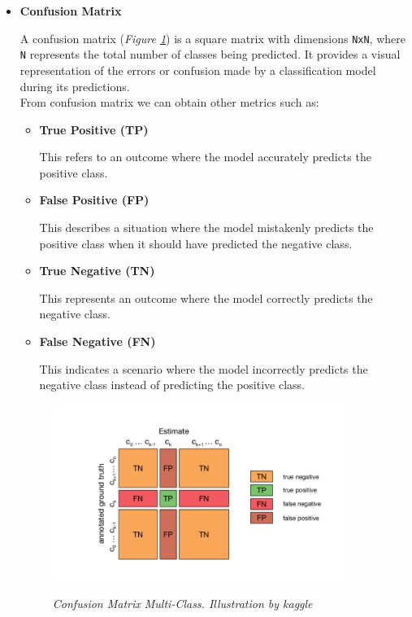 \begin{itemize}
  \item \textbf{Confusion Matrix}

A confusion matrix (\textit{Figure \ref{fig:confusion-matrix}}) is a square matrix with dimensions {\tt NxN},
where {\tt N} represents the total number of classes being predicted.
It provides a visual representation of the errors or confusion made by a classification
model during its predictions. \\

From confusion matrix we can obtain other metrics such as:

\begin{itemize}
\item \textbf{True Positive (TP)}

This refers to an outcome where the model accurately predicts the positive class.
\item \textbf{False Positive (FP)}

This describes a situation where the model mistakenly predicts the positive class when it should have predicted the negative class.
\item \textbf{True Negative (TN)}

This represents an outcome where the model correctly predicts the negative class.
\item \textbf{False Negative (FN)}

This indicates a scenario where the model incorrectly predicts the negative class instead of predicting the positive class.

\end{itemize}

\begin{figure}[H]
\begin{adjustbox}{trim={0pt 0.5cm 0pt 1cm}, clip}
\centering
\includegraphics[width=0.9\textwidth]{imatges/preliminaries/confusion-matrix.png}
\end{adjustbox}
\caption[Confusion Matrix Multi-Class]{\textit{Confusion Matrix Multi-Class. Illustration by kaggle}}
{\label{fig:confusion-matrix}}
\end{figure}


\end{itemize}
